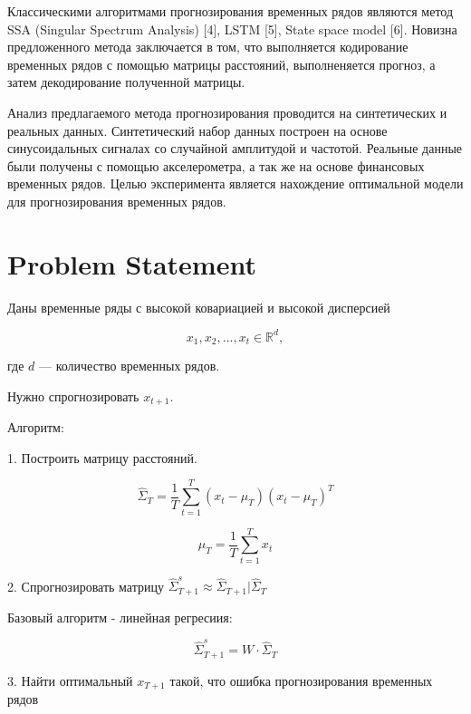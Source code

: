 \documentclass{article}
\begin{document}
Классическими алгоритмами прогнозирования временных рядов являются метод SSA (Singular Spectrum Analysis) [4], LSTM [5], State space model [6]. Новизна предложенного метода заключается в том, что выполняется кодирование временных рядов с помощью матрицы расстояний, выполненяется прогноз, а затем декодирование полученной матрицы.

Анализ предлагаемого метода прогнозирования проводится на синтетических и реальных данных. Синтетический набор данных построен на основе синусоидальных сигналах со случайной амплитудой и частотой. Реальные данные были получены с помощью акселерометра, а так же на основе финансовых временных рядов. Целью эксперимента является нахождение оптимальной модели для прогнозирования временных рядов.

\section{Problem Statement}
\label{sec:headings}

Даны временные ряды с высокой ковариацией и высокой дисперсией


\begin{equation}
	x_1, x_2, \ldots, x_t \in \mathbb{R}^d,
\end{equation}

где $d$ — количество временных рядов.

Нужно спрогнозировать $x_{t+1}$.

Алгоритм:

1. Построить матрицу расстояний.

\begin{equation}
\hat{\Sigma}_T = \frac{1}{T} \sum_{t=1}^{T} (x_t - \mu_T)(x_t - \mu_T)^T
\end{equation}

\begin{equation}
\mu_T = \frac{1}{T} \sum_{t=1}^{T} x_t
\end{equation}

2. Спрогнозировать матрицу $\hat{\Sigma}_{T+1}^s \approx \hat{\Sigma}_{T+1} | \hat{\Sigma}_{T}$

Базовый алгоритм - линейная регресиия:

\begin{equation}
\hat{\Sigma}_{T+1}^s = W \cdot \hat{\Sigma}_{T}
\end{equation}


3. Найти оптимальный $x_{T+1}$ такой, что ошибка прогнозирования временных рядов
\end{document}
